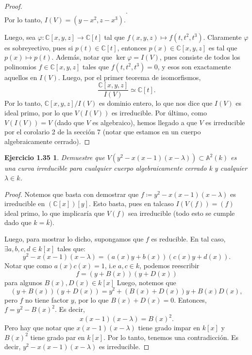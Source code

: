 \documentclass{amsart}
\theoremstyle{plain}
\newtheorem*{ejercicio2}{Ejercicio 1.35}
\newcommand{\C}{\mathbb{C}}
\begin{document}
\begin{proof}
\begin{align*}
		.\end{align*}
		Por lo tanto, $I(V) = (y - x^{2}, z - x^{3})$. \par
		Luego, sea $\varphi \colon \C[x,y,z] \to \C[t]$ tal que $f(x,y,z) \mapsto f(t,t^{2},t^{3})$. Claramente $\varphi$ es sobreyectivo, pues si $p(t) \in \C[t]$, entonces $p(x) \in \C[x,y,z]$ es tal que $p(x) \mapsto p(t)$. Además, notar que $\ker \varphi = I(V)$, pues consiste de todos los polinomios $f \in \C[x,y,z]$ tales que $f(t,t^{2},t^{3}) = 0$, y esos son exactamente aquellos en $I(V)$. Luego, por el primer teorema de isomorfismos,
		\[ \frac{\C[x,y,z]}{I(V)} \simeq \C[t]. \]
		Por lo tanto, $\C[x,y,z] \slash I(V)$ es dominio entero, lo que nos dice que $I(V)$ es ideal primo, por lo que $V(I(V))$ es irreducible. Por último, como $V(I(V)) = V$ (dado que $V$ es algebraico), hemos llegado a que $V$ es irreducible por el corolario 2 de la sección 7 (notar que estamos en un cuerpo algebraicamente cerrado).
	\end{proof}

	\begin{ejercicio2}
		Demuestre que $V(y^{2} - x(x - 1)(x - \lambda)) \subset \mathbb{A}^{2}(k)$ es una curva irreducible para cualquier cuerpo algebraicamente cerrado k y cualquier $\lambda \in k$.
	\end{ejercicio2}
	\begin{proof}
		Notemos que basta con demostrar que $f \coloneq y^{2} - x(x - 1)(x - \lambda)$ es irreducible en $(\C[x])[y]$. Esto basta, pues en talcaso $I(V(f)) = (f)$ ideal primo, lo que implicaría que $V(f)$ sea irreducible (todo esto se cumple dado que $k = \overline{k}$). \par
		Luego, para mostrar lo dicho, supongamos que $f$ es reducible. En tal caso, $\exists a,b,c,d \in k[x]$ tales que:
		\[ y^{2} - x(x - 1)(x - \lambda) = (a(x)y + b(x))(c(x)y + d(x)). \]
		Notar que como $a(x)c(x) = 1$, i.e $a,c \in k$, podemos reescribir
		\[ f = (y + B(x))(y + D(x)) \]
		para algunos $B(x),D(x) \in k[x]$ Luego, notemos que
		\[ (y + B(x))(y + D(x)) = y^{2} + (B(x) + D(x)) y + B(x)D(x), \]
		pero $f$ no tiene factor $y$, por lo que $B(x) + D(x) = 0$. Entonces, $f = y^{2} - B(x)^{2}$. Es decir,
		\[ x(x - 1)(x - \lambda) = B(x)^{2}. \]
		Pero hay que notar que $x(x - 1)(x - \lambda)$ tiene grado impar en $k[x]$ y $B(x)^{2}$ tiene grado par en $k[x]$. Por lo tanto, tenemos una contradicción. Es decir, $y^{2} - x(x - 1)(x - \lambda)$ es irreducible.
	\end{proof}
\end{document}
